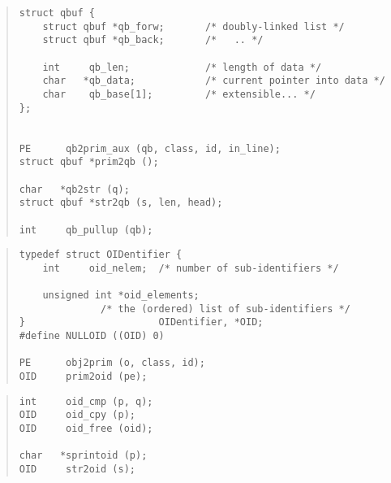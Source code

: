 \begin{bwslide}

\begin{quote}\small\begin{verbatim}
struct qbuf {
    struct qbuf *qb_forw;       /* doubly-linked list */
    struct qbuf *qb_back;       /*   .. */

    int     qb_len;             /* length of data */
    char   *qb_data;            /* current pointer into data */
    char    qb_base[1];         /* extensible... */
};


PE      qb2prim_aux (qb, class, id, in_line);
struct qbuf *prim2qb ();

char   *qb2str (q);
struct qbuf *str2qb (s, len, head);

int     qb_pullup (qb);
\end{verbatim}\end{quote}
\end{bwslide}


\begin{bwslide}

\begin{quote}\small\begin{verbatim}
typedef struct OIDentifier {
    int     oid_nelem;  /* number of sub-identifiers */

    unsigned int *oid_elements;
              /* the (ordered) list of sub-identifiers */
}                       OIDentifier, *OID;
#define NULLOID ((OID) 0)

PE      obj2prim (o, class, id);
OID     prim2oid (pe);
\end{verbatim}\end{quote}
\end{bwslide}


\begin{bwslide}

\begin{quote}\small\begin{verbatim}
int     oid_cmp (p, q);
OID     oid_cpy (p);
OID     oid_free (oid);

char   *sprintoid (p);
OID     str2oid (s);
\end{verbatim}\end{quote}
\end{bwslide}


